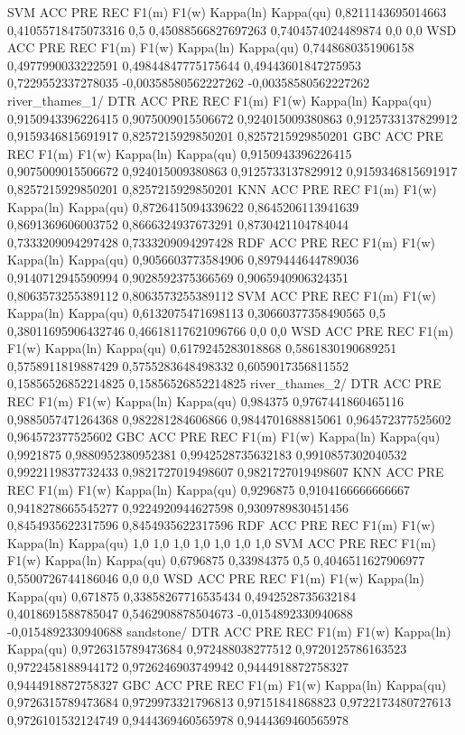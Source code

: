 SVM
ACC	PRE	REC	F1(m)	F1(w)	Kappa(ln)	Kappa(qu)
0,8211143695014663	0,41055718475073316	0,5	0,45088566827697263	0,7404574024489874	0,0	0,0
WSD
ACC	PRE	REC	F1(m)	F1(w)	Kappa(ln)	Kappa(qu)
0,7448680351906158	0,4977990033222591	0,49844847775175644	0,49443601847275953	0,7229552337278035	-0,00358580562227262	-0,00358580562227262
river_thames_1/
DTR
ACC	PRE	REC	F1(m)	F1(w)	Kappa(ln)	Kappa(qu)
0,9150943396226415	0,9075009015506672	0,924015009380863	0,9125733137829912	0,9159346815691917	0,8257215929850201	0,8257215929850201
GBC
ACC	PRE	REC	F1(m)	F1(w)	Kappa(ln)	Kappa(qu)
0,9150943396226415	0,9075009015506672	0,924015009380863	0,9125733137829912	0,9159346815691917	0,8257215929850201	0,8257215929850201
KNN
ACC	PRE	REC	F1(m)	F1(w)	Kappa(ln)	Kappa(qu)
0,8726415094339622	0,8645206113941639	0,8691369606003752	0,8666324937673291	0,8730421104784044	0,7333209094297428	0,7333209094297428
RDF
ACC	PRE	REC	F1(m)	F1(w)	Kappa(ln)	Kappa(qu)
0,9056603773584906	0,8979444644789036	0,9140712945590994	0,9028592375366569	0,9065940906324351	0,8063573255389112	0,8063573255389112
SVM
ACC	PRE	REC	F1(m)	F1(w)	Kappa(ln)	Kappa(qu)
0,6132075471698113	0,30660377358490565	0,5	0,38011695906432746	0,46618117621096766	0,0	0,0
WSD
ACC	PRE	REC	F1(m)	F1(w)	Kappa(ln)	Kappa(qu)
0,6179245283018868	0,5861830190689251	0,5758911819887429	0,5755283648498332	0,6059017356811552	0,15856526852214825	0,15856526852214825
river_thames_2/
DTR
ACC	PRE	REC	F1(m)	F1(w)	Kappa(ln)	Kappa(qu)
0,984375	0,9767441860465116	0,9885057471264368	0,982281284606866	0,9844701688815061	0,964572377525602	0,964572377525602
GBC
ACC	PRE	REC	F1(m)	F1(w)	Kappa(ln)	Kappa(qu)
0,9921875	0,9880952380952381	0,9942528735632183	0,9910857302040532	0,9922119837732433	0,9821727019498607	0,9821727019498607
KNN
ACC	PRE	REC	F1(m)	F1(w)	Kappa(ln)	Kappa(qu)
0,9296875	0,9104166666666667	0,9418278665545277	0,9224920944627598	0,9309789830451456	0,8454935622317596	0,8454935622317596
RDF
ACC	PRE	REC	F1(m)	F1(w)	Kappa(ln)	Kappa(qu)
1,0	1,0	1,0	1,0	1,0	1,0	1,0
SVM
ACC	PRE	REC	F1(m)	F1(w)	Kappa(ln)	Kappa(qu)
0,6796875	0,33984375	0,5	0,4046511627906977	0,5500726744186046	0,0	0,0
WSD
ACC	PRE	REC	F1(m)	F1(w)	Kappa(ln)	Kappa(qu)
0,671875	0,33858267716535434	0,4942528735632184	0,4018691588785047	0,5462908878504673	-0,0154892330940688	-0,0154892330940688
sandstone/
DTR
ACC	PRE	REC	F1(m)	F1(w)	Kappa(ln)	Kappa(qu)
0,9726315789473684	0,972488038277512	0,9720125786163523	0,9722458188944172	0,9726246903749942	0,9444918872758327	0,9444918872758327
GBC
ACC	PRE	REC	F1(m)	F1(w)	Kappa(ln)	Kappa(qu)
0,9726315789473684	0,9729973321796813	0,97151841868823	0,9722173480727613	0,9726101532124749	0,9444369460565978	0,9444369460565978
